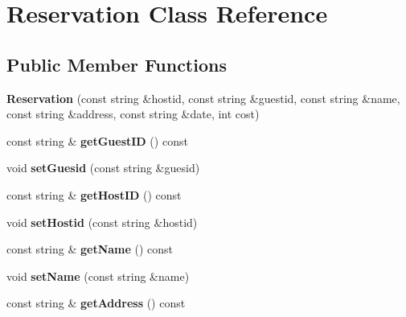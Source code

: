 \hypertarget{class_reservation}{}\section{Reservation Class Reference}
\label{class_reservation}
\subsection*{Public Member Functions}
\begin{DoxyCompactItemize}
\item 
\mbox{\label{class_reservation_a4ce6d165547e6b575a0486a43d756cba}} 
{\bfseries Reservation} (const string \&hostid, const string \&guestid, const string \&name, const string \&address, const string \&date, int cost)
\item 
\mbox{\label{class_reservation_a3a17896182f418576039658a70f97452}} 
const string \& {\bfseries get\+Guest\+ID} () const
\item 
\mbox{\label{class_reservation_ac43be40b51d10a9d2862a323858521d1}} 
void {\bfseries set\+Guesid} (const string \&guesid)
\item 
\mbox{\label{class_reservation_a3dbe71a8f1ba4ec469653d305c8a2f28}} 
const string \& {\bfseries get\+Host\+ID} () const
\item 
\mbox{\label{class_reservation_aaed786c6301ebddfb93fe98e7d4c27c0}} 
void {\bfseries set\+Hostid} (const string \&hostid)
\item 
\mbox{\label{class_reservation_aaf6681475402a5a34ff9dc0e374c42b4}} 
const string \& {\bfseries get\+Name} () const
\item 
\mbox{\label{class_reservation_ac0d1a56baec2d31202bbb89b71b78f4f}} 
void {\bfseries set\+Name} (const string \&name)
\item 
\mbox{\label{class_reservation_aaa52ea0877fab25ac0eb37b83ae2a5f3}} 
const string \& {\bfseries get\+Address} () const
\item 
\mbox{\label{class_reservation_af54a505ed0d448e5436abf55afb3c15b}} 

\end{DoxyCompactItemize}
